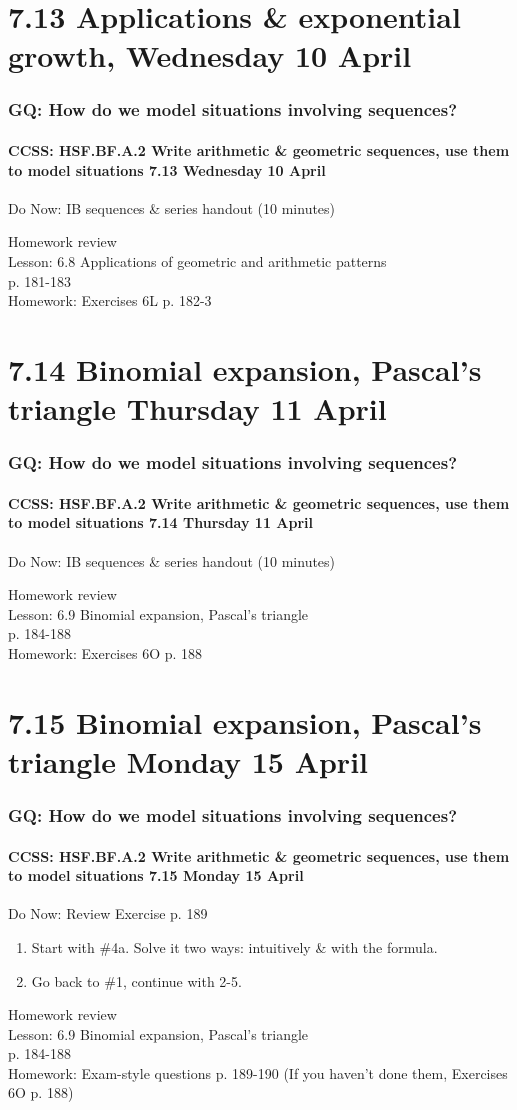 \documentclass{beamer}
\begin{document}
\section{7.13 Applications \& exponential growth, Wednesday 10 April}
  \frame
  {
    \frametitle{GQ: How do we model situations involving sequences?}
    \framesubtitle{CCSS: HSF.BF.A.2 Write arithmetic \& geometric sequences, use them to model situations \hfill \alert{7.13 Wednesday 10 April}}

    \begin{block}{Do Now: IB sequences \& series handout (10 minutes)}
    \end{block}
    Homework review\\
    Lesson: 6.8 Applications of geometric and arithmetic patterns \\p. 181-183\\[1cm]
    Homework: Exercises 6L p.  182-3
  }

\section{7.14 Binomial expansion, Pascal's triangle Thursday 11 April}
  \frame
  {
    \frametitle{GQ: How do we model situations involving sequences?}
    \framesubtitle{CCSS: HSF.BF.A.2 Write arithmetic \& geometric sequences, use them to model situations \hfill \alert{7.14 Thursday 11 April}}

    \begin{block}{Do Now: IB sequences \& series handout (10 minutes)}
    \end{block}
    Homework review\\
    Lesson: 6.9 Binomial expansion, Pascal's triangle \\p. 184-188\\[1cm]
    Homework: Exercises 6O p.  188
  }

\section{7.15 Binomial expansion, Pascal's triangle Monday 15 April}
  \frame
  {
    \frametitle{GQ: How do we model situations involving sequences?}
    \framesubtitle{CCSS: HSF.BF.A.2 Write arithmetic \& geometric sequences, use them to model situations \hfill \alert{7.15 Monday 15 April}}

    \begin{block}{Do Now: Review Exercise p. 189}
      \begin{enumerate}
        \item Start with \#4a. Solve it two ways: intuitively \& with the formula.
        \item Go back to \#1, continue with 2-5.
    \end{enumerate}
    \end{block}
    Homework review\\
    Lesson: 6.9 Binomial expansion, Pascal's triangle \\p. 184-188\\[1cm]
    Homework: Exam-style questions p. 189-190 (If you haven't done them, Exercises 6O p.  188)
  }
\end{document}
